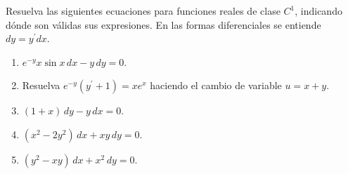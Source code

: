 Resuelva las siguientes ecuaciones para funciones reales de clase $C^1$, indicando dónde son válidas sus expresiones. En las formas diferenciales se entiende $dy=y^{\prime}dx$.

\begin{enumerate}[label=(\alph*),ref=\alph*,leftmargin=*]
\item $e^{-y}x\sin x\,dx-y\,dy=0$.
\item Resuelva $e^{-y}(y^{\prime}+1)=xe^x$ haciendo el cambio de variable $u=x+y$.
\item $(1+x)\,dy-y\,dx=0$.
\item $(x^2-2y^2)\,dx+xy\,dy=0$.
\item $(y^2-xy)\,dx+x^2\,dy=0$.
\end{enumerate}
